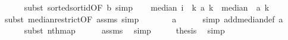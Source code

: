 \begin{isabellebody}
\ \ \ \ \isamarkupfalse%
\ {\isacharparenleft}{\kern0pt}subst\ sorted{\isacharunderscore}{\kern0pt}sort{\isacharunderscore}{\kern0pt}id{\isacharbrackleft}{\kern0pt}OF\ b{\isacharbrackright}{\kern0pt}{\isacharcomma}{\kern0pt}\ simp{\isacharparenright}{\kern0pt}\isanewline
\ \ \isamarkupfalse%
\ {\isachardoublequoteopen}median\ {\isacharparenleft}{\kern0pt}{\isasymlambda}i\ {\isasymin}\ {\isacharbraceleft}{\kern0pt}{}{\isachardot}{\kern0pt}{\isachardot}{\kern0pt}{\isacharless}{\kern0pt}k{\isacharbraceright}{\kern0pt}{\isachardot}{\kern0pt}\ a{\isacharparenright}{\kern0pt}\ k\ {\isacharequal}{\kern0pt}\ median\ {\isacharparenleft}{\kern0pt}{\isasymlambda}{\isacharunderscore}{\kern0pt}{\isachardot}{\kern0pt}\ a{\isacharparenright}{\kern0pt}\ k{\isachardoublequoteclose}\isanewline
\ \ \ \ \isamarkupfalse%
\ {\isacharparenleft}{\kern0pt}subst\ median{\isacharunderscore}{\kern0pt}restrict{\isacharbrackleft}{\kern0pt}OF\ assms{\isacharparenleft}{\kern0pt}{}{\isacharparenright}{\kern0pt}{\isacharbrackright}{\kern0pt}{\isacharcomma}{\kern0pt}\ simp{\isacharparenright}{\kern0pt}\isanewline
\ \ \isamarkupfalse%
\ \isamarkupfalse%
\ {\isachardoublequoteopen}{\isachardot}{\kern0pt}{\isachardot}{\kern0pt}{\isachardot}{\kern0pt}\ {\isacharequal}{\kern0pt}\ a{\isachardoublequoteclose}\isanewline
\ \ \ \ \isamarkupfalse%
\ {\isacharparenleft}{\kern0pt}simp\ add{\isacharcolon}{\kern0pt}median{\isacharunderscore}{\kern0pt}def\ a{\isacharparenright}{\kern0pt}\isanewline
\ \ \ \ \isamarkupfalse%
\ {\isacharparenleft}{\kern0pt}subst\ nth{\isacharunderscore}{\kern0pt}map{\isacharparenright}{\kern0pt}\isanewline
\ \ \ \ \isamarkupfalse%
\ assms\ \isamarkupfalse%
\ simp{\isacharplus}{\kern0pt}\isanewline
\ \ \isamarkupfalse%
\ \isamarkupfalse%
\ {\isacharquery}{\kern0pt}thesis\ \isamarkupfalse%
\ simp\isanewline
{}\isamarkupfalse%
%
\endisatagproof
{\isafoldproof}%
%
\isadelimproof
\isanewline
%
\endisadelimproof
%
\isadelimtheory
\isanewline
%
\endisadelimtheory
%
\isatagtheory
{}\isamarkupfalse%
%
\endisatagtheory
{\isafoldtheory}%
%
\isadelimtheory
%
\endisadelimtheory
%
\end{isabellebody}%
\endinput

